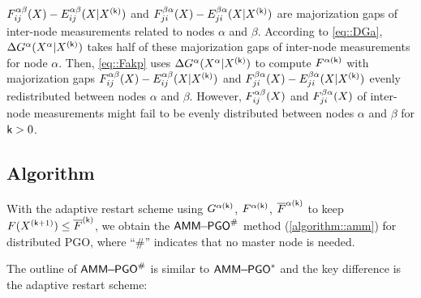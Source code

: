 \begin{remark}
	\highlight
	$F_{ij}^{\alpha\beta}(X)-E_{ij}^{\alpha\beta}(X|X^{(\mathsf{k})})$ and $F_{ji}^{\beta\alpha}(X)-E_{ji}^{\beta\alpha}(X|X^{(\mathsf{k})})$ are majorization gaps of inter-node measurements  related to nodes $\alpha$ and $\beta$.  According to \cref{eq::DGa}, $\Delta G^{\alpha}(X^\alpha|X^{(\mathsf{k})})$ takes half of  these majorization gaps of inter-node measurements for node $\alpha$.  Then, \cref{eq::Fakp} uses $\Delta G^\alpha(X^\alpha|X^{(\mathsf{k})})$ to compute $F^{\alpha(\mathsf{k})}$ with majorization gaps $F_{ij}^{\alpha\beta}(X)-E_{ij}^{\alpha\beta}(X|X^{(\mathsf{k})})$ and $F_{ji}^{\beta\alpha}(X)-E_{ji}^{\beta\alpha}(X|X^{(\mathsf{k})})$ evenly redistributed between nodes $\alpha$ and $\beta$. However, $F_{ij}^{\alpha\beta}(X)$ and $F_{ji}^{\beta\alpha}(X)$ of inter-node measurements might fail to be evenly distributed between nodes $\alpha$ and $\beta$ for $\mathsf{k}>0$.
\end{remark}




\vspace{-0.5em}
\subsection{Algorithm}\label{section::amm::algorithm}
With the adaptive restart scheme using $G^{\alpha(\mathsf{k})}$, $F^{\alpha(\mathsf{k})}$, $\overline{F}^{\alpha(\mathsf{k})}$ to keep $F(X^{(\mathsf{k}+1)})\leq \overline{F}^{(\mathsf{k})}$, we obtain the $\mathsf{AMM\!\!-\!\!PGO}^{\#}$ method (\cref{algorithm::amm}) for distributed PGO, where ``$\#$'' indicates that no master node is needed.

The outline of  $\mathsf{AMM\!\!-\!\!PGO}^{\#}$  is similar to  $\mathsf{AMM\!\!-\!\!PGO}^*$  and the key difference is the adaptive restart scheme:

